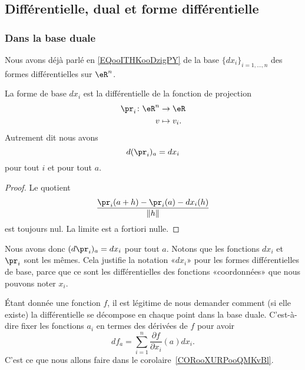 \subsection{Différentielle, dual et forme différentielle}

\subsubsection{Dans la base duale}

Nous avons déjà parlé en \eqref{EQooITHKooDzigPY} de la base \( \{ dx_i \}_{i=1,\ldots, n}\) des formes différentielles sur \( \eR^n\).

\begin{proposition}
	La forme de base \( dx_i\) est la différentielle de la fonction de projection
	\begin{equation}
		\begin{aligned}
			\pr_i\colon \eR^n & \to \eR      \\
			v                 & \mapsto v_i.
		\end{aligned}
	\end{equation}
	Autrement dit nous avons
	\begin{equation}
		d(\pr_i)_a=dx_i
	\end{equation}
	pour tout \( i\) et pour tout \( a\).
\end{proposition}

\begin{proof}
	Le quotient
	\begin{equation}
		\frac{ \pr_i(a+h)-\pr_i(a)-dx_i(h) }{ \| h \| }
	\end{equation}
	est toujours nul. La limite est a fortiori nulle.
\end{proof}

Nous avons donc \( (d\pr_i)_a=dx_i\) pour tout \( a\). Notons que les fonctions \( dx_i\) et \( \pr_i\) sont les mêmes. Cela justifie la notation «\( dx_i\)» pour les formes différentielles de base, parce que ce sont les différentielles des fonctions «coordonnées» que nous pouvons noter \( x_i\).

Étant donnée une fonction \( f\), il est légitime de nous demander comment (si elle existe) la différentielle se décompose en chaque point dans la base duale. C'est-à-dire fixer les fonctions \( a_i\) en termes des dérivées de \( f\) pour avoir
\begin{equation}
	df_a=\sum_{i=1}^n\frac{ \partial f }{ \partial x_i }(a)dx_i.
\end{equation}
C'est ce que nous allons faire dans le corolaire~\ref{CORooXURPooQMKvBl}.

